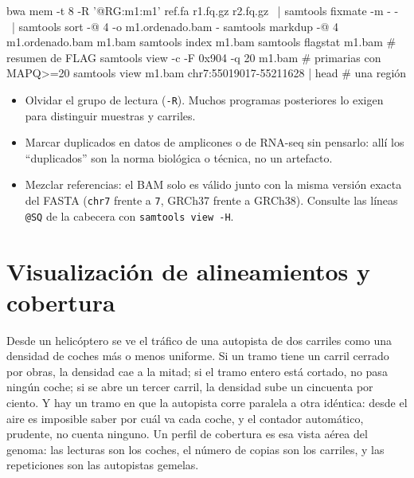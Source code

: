 \begin{consola}
bwa mem -t 8 -R '@RG\tID:m1\tSM:m1' ref.fa r1.fq.gz r2.fq.gz \
  | samtools fixmate -m - - \
  | samtools sort -@ 4 -o m1.ordenado.bam -
samtools markdup -@ 4 m1.ordenado.bam m1.bam
samtools index m1.bam
samtools flagstat m1.bam              # resumen de FLAG
samtools view -c -F 0x904 -q 20 m1.bam  # primarias con MAPQ>=20
samtools view m1.bam chr7:55019017-55211628 | head   # una región
\end{consola}

\begin{cuidado}
\begin{itemize}
  \item Olvidar el grupo de lectura (\texttt{-R}). Muchos programas posteriores lo exigen para distinguir muestras y carriles.
  \item Marcar duplicados en datos de amplicones o de RNA-seq sin pensarlo: allí los ``duplicados'' son la norma biológica o técnica, no un artefacto.
  \item Mezclar referencias: el BAM solo es válido junto con la misma versión exacta del FASTA (\texttt{chr7} frente a \texttt{7}, GRCh37 frente a GRCh38). Consulte las líneas \texttt{@SQ} de la cabecera con \texttt{samtools view -H}.
\end{itemize}
\end{cuidado}

\section{Visualización de alineamientos y cobertura}\label{sec:07-cobertura}

\begin{intuicion}
Desde un helicóptero se ve el tráfico de una autopista de dos carriles como una densidad de coches más o menos uniforme. Si un tramo tiene un carril cerrado por obras, la densidad cae a la mitad; si el tramo entero está cortado, no pasa ningún coche; si se abre un tercer carril, la densidad sube un cincuenta por ciento. Y hay un tramo en que la autopista corre paralela a otra idéntica: desde el aire es imposible saber por cuál va cada coche, y el contador automático, prudente, no cuenta ninguno. Un perfil de cobertura es esa vista aérea del genoma: las lecturas son los coches, el número de copias son los carriles, y las repeticiones son las autopistas gemelas.
\end{intuicion}

